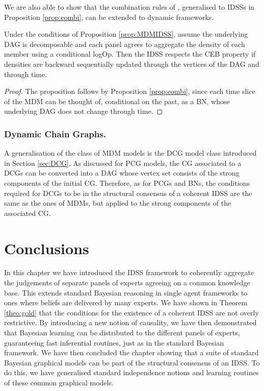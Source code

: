 We are also able to show that the combination rules of \citet{Faria1997}, generalised to IDSSs in Proposition \ref{prop:combi}, can be extended to dynamic frameworks.
\begin{proposition}
\label{prop:dyncombi}
Under the conditions of Proposition \ref{prop:MDMIDSS}, assume the underlying DAG is decomposable and each panel agrees to aggregate the density of each member using a conditional logOp. Then the IDSS respects the CEB property if densities are backward sequentially updated through the vertices of the DAG and through time.
\end{proposition}

\begin{proof}
The proposition follows by Proposition \ref{prop:combi}, since each time slice of the MDM can be thought of, conditional on the past, as a BN, whose underlying DAG does not change through time.
\end{proof}


\subsubsection{Dynamic Chain Graphs.}
A generalisation of the class of MDM models is the DCG model class introduced in Section \ref{sec:DCG}. As discussed for PCG models, the CG associated to a DCGs can be converted into a DAG whose vertex set consists of the strong components of the initial CG. Therefore, as for PCGs and BNs, the conditions required for DCGs to be in the structural consensus of a coherent IDSS are the same as the ones of MDMs, but applied to the strong components of the associated CG.

\section{Conclusions}
 In this chapter we have introduced the IDSS framework to coherently aggregate the judgements of separate panels of experts agreeing on a common knowledge base. This extends standard Bayesian reasoning in single agent frameworks to ones where beliefs are delivered by many experts. We have shown in Theorem \ref{theo:gold} that the conditions for the existence of a coherent IDSS are not overly restrictive. By introducing a new notion of causality, we have then demonstrated that Bayesian learning can be distributed to the different panels of experts, guaranteeing fast inferential routines, just as in the standard Bayesian framework. We have then concluded the chapter showing that a suite of standard Bayesian graphical models can be part of the structural consensus of an IDSS. To do this, we have generalised standard independence notions and learning routines of these common graphical models.  